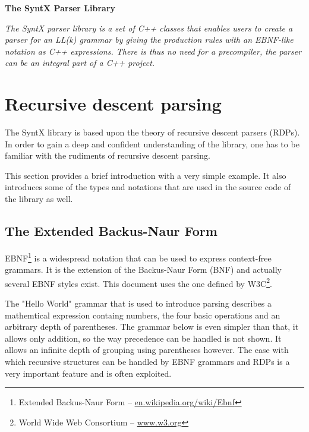 \documentclass[12pt]{article}
\begin{document}
\sloppy

\vspace*{2em}
\centerline{\Huge\textbf{The SyntX Parser Library}}
\vspace{5em}

\begin{center}
	\begin{minipage}[h]{0.85\linewidth}
		\itshape
		The SyntX parser library is a set of C++ classes that enables users to create a parser for an
		LL(k) grammar by giving the production rules with an EBNF-like notation as C++ expressions. There is
		thus no need for a precompiler, the parser can be an integral part of a C++ project.
	\end{minipage}
\end{center}

\vspace{4.5em}

\section*{Recursive descent parsing}
The SyntX library is based upon the theory of recursive descent parsers (RDPs). In order to gain a deep and confident
understanding of the library, one has to be familiar with the rudiments of recursive descent parsing.

This section provides a brief introduction with a very simple example. It also introduces some of the types
and notations that are used in the source code of the library as well.

\subsection*{The Extended Backus-Naur Form}
EBNF\footnote{Extended Backus-Naur Form --
\href{http://en.wikipedia.org/wiki/Ebnf}{en.wikipedia.org/wiki/Ebnf}} is a widespread notation that can be
used to express context-free grammars. It is the extension of the Backus-Naur Form (BNF) and actually several
EBNF styles exist. This document uses the one defined by W3C\footnote{World Wide Web Consortium --
\href{http://www.w3.org}{www.w3.org}}.

The "Hello World" grammar that is used to introduce parsing describes a mathemtical expression containg
numbers, the four basic operations and an arbitrary depth of parentheses. The grammar below is even simpler
than that, it allows only addition, so the way precedence can be handled is not shown. It allows an infinite
depth of grouping using parentheses however. The ease with which recursive structures can be handled by
EBNF grammars and RDPs is a very important feature and is often exploited.
\end{document}
